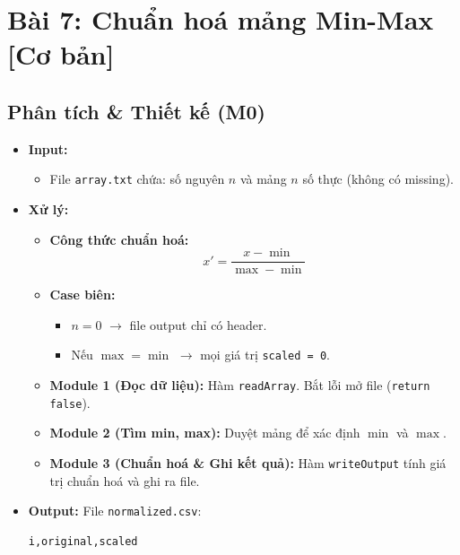 \section{Bài 7: Chuẩn hoá mảng Min-Max [Cơ bản]}

\subsection{Phân tích \& Thiết kế (M0)}
\begin{itemize}
    \item \textbf{Input:}
    \begin{itemize}
        \item File \texttt{array.txt} chứa: số nguyên $n$ và mảng $n$ số thực (không có missing).
    \end{itemize}

    \item \textbf{Xử lý:}
    \begin{itemize}
        \item \textbf{Công thức chuẩn hoá:}
        \[
        x' = \frac{x - \min}{\max - \min}
        \]

        \item \textbf{Case biên:}
        \begin{itemize}
            \item $n = 0$ $\rightarrow$ file output chỉ có header.
            \item Nếu $\max = \min$ $\rightarrow$ mọi giá trị \texttt{scaled = 0}.
        \end{itemize}

        \item \textbf{Module 1 (Đọc dữ liệu):} Hàm \texttt{readArray}. Bắt lỗi mở file (\texttt{return false}).
        \item \textbf{Module 2 (Tìm min, max):} Duyệt mảng để xác định $\min$ và $\max$.
        \item \textbf{Module 3 (Chuẩn hoá \& Ghi kết quả):} Hàm \texttt{writeOutput} tính giá trị chuẩn hoá và ghi ra file.
    \end{itemize}

    \item \textbf{Output:}
    File \texttt{normalized.csv}:
\begin{lstlisting}
i,original,scaled
\end{lstlisting}
\end{itemize}

